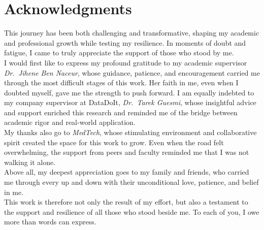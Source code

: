 \chapter*{Acknowledgments}
\thispagestyle{plain}

This journey has been both challenging and transformative, shaping my academic and professional growth while testing my resilience. In moments of doubt and fatigue, I came to truly appreciate the support of those who stood by me.\\

\noindent I would first like to express my profound gratitude to my academic supervisor \emph{Dr.\ Jihene Ben Naceur}, whose guidance, patience, and encouragement carried me through the most difficult stages of this work. Her faith in me, even when I doubted myself, gave me the strength to push forward. I am equally indebted to my company supervisor at DataDoIt, \emph{Dr.\ Tarek Guesmi}, whose insightful advice and support enriched this research and reminded me of the bridge between academic rigor and real-world application.\\

\noindent My thanks also go to \emph{MedTech}, whose stimulating environment and collaborative spirit created the space for this work to grow. Even when the road felt overwhelming, the support from peers and faculty reminded me that I was not walking it alone.\\

\noindent Above all, my deepest appreciation goes to my family and friends, who carried me through every up and down with their unconditional love, patience, and belief in me.\\

\noindent This work is therefore not only the result of my effort, but also a testament to the support and resilience of all those who stood beside me. To each of you, I owe more than words can express.
